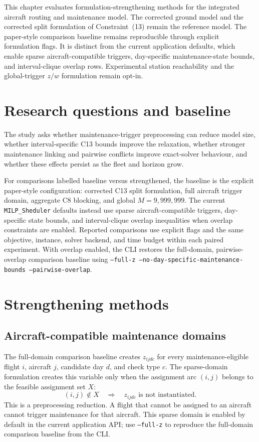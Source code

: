 \label{ch:strengthening}

This chapter evaluates formulation-strengthening methods for the integrated
aircraft routing and maintenance model. The corrected ground model and the
corrected split formulation of Constraint~(13) remain the reference model.
The paper-style comparison baseline remains reproducible through explicit
formulation flags. It is distinct from the current application defaults, which
enable sparse aircraft-compatible triggers, day-specific maintenance-state
bounds, and interval-clique overlap rows. Experimental station reachability
and the global-trigger $z/w$ formulation remain opt-in.

\section{Research questions and baseline}

The study asks whether maintenance-trigger preprocessing can reduce model size,
whether interval-specific C13 bounds improve the relaxation, whether stronger
maintenance linking and pairwise conflicts improve exact-solver behaviour, and
whether these effects persist as the fleet and horizon grow.

For comparisons labelled baseline versus strengthened, the baseline is the
explicit paper-style configuration: corrected C13 split formulation, full
aircraft trigger domain, aggregate C8 blocking, and global $M=9{,}999{,}999$.
The current \texttt{MILP\_Sheduler} defaults instead use sparse
aircraft-compatible triggers, day-specific state bounds, and interval-clique
overlap inequalities when overlap constraints are enabled. Reported comparisons
use explicit flags and the same objective, instance, solver backend, and time
budget within each paired experiment. With overlap enabled, the CLI restores
the full-domain, pairwise-overlap comparison baseline using
\texttt{--full-z --no-day-specific-maintenance-bounds --pairwise-overlap}.

\section{Strengthening methods}

\subsection{Aircraft-compatible maintenance domains}

The full-domain comparison baseline creates $z_{ijdc}$ for every
maintenance-eligible flight $i$, aircraft $j$, candidate day $d$, and check
type $c$. The sparse-domain formulation creates this variable only when the
assignment arc $(i,j)$ belongs to the feasible assignment set $X$:
\begin{equation}
 (i,j)\notin X \quad\Longrightarrow\quad z_{ijdc}\text{ is not instantiated}.
\end{equation}
This is a preprocessing reduction. A flight that cannot be assigned to an
aircraft cannot trigger maintenance for that aircraft. This sparse domain is
enabled by default in the current application API; use \texttt{--full-z} to
reproduce the full-domain comparison baseline from the CLI.

